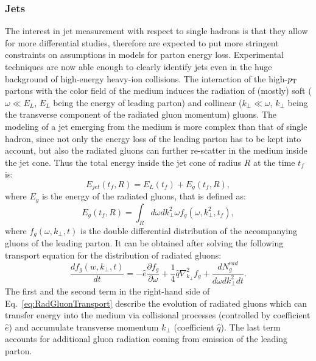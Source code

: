 \subsubsection{Jets}
The interest in jet measurement with respect to single hadrons is that 
they allow for more differential studies, therefore are expected to put 
more stringent constraints on assumptions in models for parton energy loss. 
Experimental techniques are now able enough to clearly identify jets 
even in the huge background of high-energy heavy-ion collisions. 
The interaction of the high-$p_{\rm T}$ partons with the color field of the medium
 induces the radiation of (mostly) soft ($\omega \ll E_{L}$, $E_L$ being the 
 energy of leading parton) and collinear ($k_{\perp} \ll \omega$, $k_{\perp}$ being
 the transverse component of the radiated gluon momentum) gluons. The 
 modeling of a jet emerging from the medium is more complex than that of
  single hadron, since not only the energy loss of the leading parton has to be 
  kept into account, but also the radiated gluons can further re-scatter in the 
  medium inside the jet cone. Thus the total energy inside the jet cone 
  of radius $R$ at the time $t_f$ is:
\begin{equation}
\label{eq:EnergyJet}
E_{jet}(t_f,R) = E_L(t_f) +E_g(t_f,R),
\end{equation}
where $E_g$ is the energy of the radiated gluons, that is defined as:
\begin{equation}
\label{eq:Eg}
E_g(t_f,R) = \int_R d\omega dk^2_\perp \omega f_g(\omega,k^2_\perp,t_f),
\end{equation}
where $f_g(\omega,k_{\perp},t)$ is the double differential distribution of 
the accompanying gluons of the leading parton. It can be obtained after solving 
the following transport equation for the distribution of radiated gluons:
\begin{equation}
\label{eq:RadGluonTransport}
\frac{df_g(w,k_{\perp},t)}{dt} = -\hat{e}\frac{\partial f_g}{\partial \omega} + \frac{1}{4}\hat{q}\nabla^2_{k_{\perp}}f_g + \frac{dN^{rad}_g}{d\omega dk^2_{\perp} dt}.
\end{equation}
The first and the second term in the right-hand side of Eq.~\ref{eq:RadGluonTransport} 
describe the evolution of radiated gluons which can transfer energy 
into the medium via collisional processes (controlled by coefficient 
$\hat{e}$) and accumulate transverse momentum $k_\perp$ 
(coefficient $\hat{q}$). The last term accounts for additional gluon 
radiation coming from emission of the leading parton.\\
